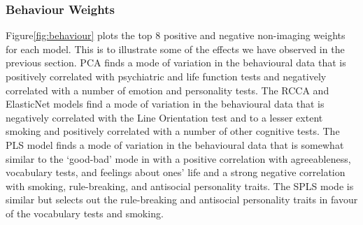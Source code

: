 \subsubsection{Behaviour Weights}

Figure\ref{fig:behaviour} plots the top 8 positive and negative non-imaging \gls{weights} for each model.
This is to illustrate some of the effects we have observed in the previous section.
PCA finds a mode of variation in the behavioural data that is positively correlated with psychiatric and life function tests and negatively correlated with a number of emotion and personality tests.
The RCCA and ElasticNet models find a mode of variation in the behavioural data that is negatively correlated with the Line Orientation test and to a lesser extent smoking and positively correlated with a number of other cognitive tests.
The PLS model finds a mode of variation in the behavioural data that is somewhat similar to the `good-bad' mode in\cite{smith2015positive} with a positive correlation with agreeableness, vocabulary tests, and feelings about ones' life and a strong negative correlation with smoking, rule-breaking, and antisocial personality traits.
The SPLS mode is similar but selects out the rule-breaking and antisocial personality traits in favour of the vocabulary tests and smoking.

